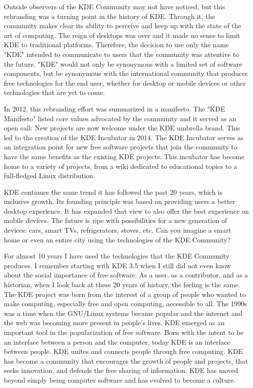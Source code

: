 Outside observers of the KDE Community may not have noticed, but this rebranding was a turning point in the history of KDE. Through it, the community makes clear its ability to perceive and keep up with the state of the art of computing. The reign of desktops was over and it made no sense to limit KDE to traditional platforms. Therefore, the decision to use only the name "KDE" intended to communicate to users that the community was attentive to the future. "KDE" would not only be synonymous with a limited set of software components, but be synonymous with the international community that produces free technologies for the end user, whether for desktop or mobile devices or other technologies that are yet to come. 

In 2012, this rebranding effort was summarized in a manifesto. The "KDE Manifesto" listed core values advocated by the community and it served as an open call: New projects are now welcome under the KDE umbrella brand. This led to the creation of the KDE Incubator in 2014. The KDE Incubator serves as an integration point for new free software projects that join the community to have the same benefits as the existing KDE projects. This incubator has become home to a variety of projects, from a wiki dedicated to educational topics to a full-fledged Linux distribution. 

KDE continues the same trend it has followed the past 20 years, which is inclusive growth. Its founding principle was based on providing users a better desktop experience. It has expanded that view to also offer the best experience on mobile devices. The future is ripe with possibilities for a new generation of devices: cars, smart TVs, refrigerators, stoves, etc. Can you imagine a smart home or even an entire city using the technologies of the KDE Community? 

For almost 10 years I have used the technologies that the KDE Community produces. I remember starting with KDE 3.5 when I still did not even know about the social importance of free software. As a user, as a contributor, and as a historian, when I look back at these 20 years of history, the feeling is the same. The KDE project was born from the interest of a group of people who wanted to make computing, especially free and open computing, accessible to all. The 1990s was a time when the GNU/Linux systems became popular and the internet and the web was becoming more present in people's lives. KDE emerged as an important tool in the popularization of free software. Born with the intent to be an interface between a person and the computer, today KDE is an interface between people. KDE unites and connects people through free computing. KDE has become a community that encourages the growth of people and projects, that seeks innovation, and defends the free sharing of information. KDE has moved beyond simply being computer software and has evolved to become a culture.
